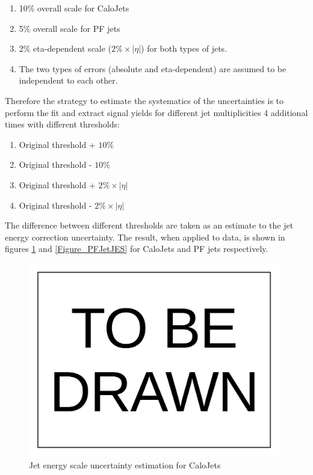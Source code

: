 \documentclass[10pt,a4paper,onecolumn]{	article}
\begin{document}
\begin{enumerate}
\item 10\% overall scale for CaloJets
\item 5\% overall scale for PF jets
\item 2\% eta-dependent scale ($2\% \times |\eta|$) for both types of jets.
\item The two types of errors (absolute and eta-dependent) are assumed to be independent to each other.
\end{enumerate}

Therefore the strategy to estimate the systematics of the uncertainties is to perform the fit and extract signal yields for different jet multiplicities 4 additional times with different thresholds:

\begin{enumerate}
\item Original threshold + $10\%$
\item Original threshold - $10\%$
\item Original threshold + $2\% \times |\eta|$
\item Original threshold - $2\% \times |\eta|$
\end{enumerate}

The difference between different thresholds are taken as an estimate to the jet energy correction uncertainty.
The result, when applied to data, is shown in figures \ref{Figure_CaloJetJES} and \ref{Figure_PFJetJES} for CaloJets and PF jets respectively.

\begin{figure}
\includegraphics[width=110mm]{ToBeDrawn.pdf}
\caption{Jet energy scale uncertainty estimation for CaloJets}
\label{Figure_CaloJetJES}
\end{figure}
\end{document}
